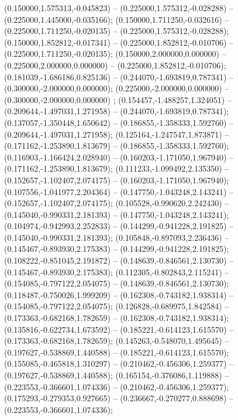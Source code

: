  (0.150000,1.575313,-0.045823) -- (0.225000,1.575312,-0.028288) -- (0.225000,1.445000,-0.035166);
 (0.150000,1.711250,-0.032616) -- (0.225000,1.711250,-0.020135) -- (0.225000,1.575312,-0.028288);
 (0.150000,1.852812,-0.017341) -- (0.225000,1.852812,-0.010706) -- (0.225000,1.711250,-0.020135);
 (0.150000,2.000000,0.000000) -- (0.225000,2.000000,0.000000) -- (0.225000,1.852812,-0.010706);
 (0.181039,-1.686186,0.825136) -- (0.244070,-1.693819,0.787341) -- (0.300000,-2.000000,0.000000);
 (0.225000,-2.000000,0.000000) -- (0.300000,-2.000000,0.000000) ;
 (0.154457,-1.488257,1.324051) -- (0.209644,-1.497031,1.271958) -- (0.244070,-1.693819,0.787341);
 (0.137057,-1.350448,1.650642) -- (0.186855,-1.358333,1.592760) -- (0.209644,-1.497031,1.271958);
 (0.125164,-1.247547,1.873871) -- (0.171162,-1.253890,1.813679) -- (0.186855,-1.358333,1.592760);
 (0.116903,-1.166424,2.028940) -- (0.160203,-1.171050,1.967940) -- (0.171162,-1.253890,1.813679);
 (0.111233,-1.099492,2.135350) -- (0.152657,-1.102407,2.074175) -- (0.160203,-1.171050,1.967940);
 (0.107556,-1.041977,2.204364) -- (0.147750,-1.043248,2.143241) -- (0.152657,-1.102407,2.074175);
 (0.105528,-0.990620,2.242430) -- (0.145040,-0.990331,2.181393) -- (0.147750,-1.043248,2.143241);
 (0.104974,-0.942993,2.252833) -- (0.144299,-0.941228,2.191825) -- (0.145040,-0.990331,2.181393);
 (0.105848,-0.897093,2.236436) -- (0.145467,-0.893930,2.175383) -- (0.144299,-0.941228,2.191825);
 (0.108222,-0.851045,2.191872) -- (0.148639,-0.846561,2.130730) -- (0.145467,-0.893930,2.175383);
 (0.112305,-0.802843,2.115241) -- (0.154085,-0.797122,2.054075) -- (0.148639,-0.846561,2.130730);
 (0.118487,-0.750026,1.999209) -- (0.162308,-0.743182,1.938314) -- (0.154085,-0.797122,2.054075);
 (0.126828,-0.689975,1.842584) -- (0.173363,-0.682168,1.782659) -- (0.162308,-0.743182,1.938314);
 (0.135816,-0.622734,1.673592) -- (0.185221,-0.614123,1.615570) -- (0.173363,-0.682168,1.782659);
 (0.145263,-0.548070,1.495645) -- (0.197627,-0.538869,1.440588) -- (0.185221,-0.614123,1.615570);
 (0.155085,-0.465818,1.310297) -- (0.210462,-0.456306,1.259377) -- (0.197627,-0.538869,1.440588);
 (0.165154,-0.376086,1.119888) -- (0.223553,-0.366601,1.074336) -- (0.210462,-0.456306,1.259377);
 (0.175293,-0.279353,0.927665) -- (0.236667,-0.270277,0.888698) -- (0.223553,-0.366601,1.074336);

